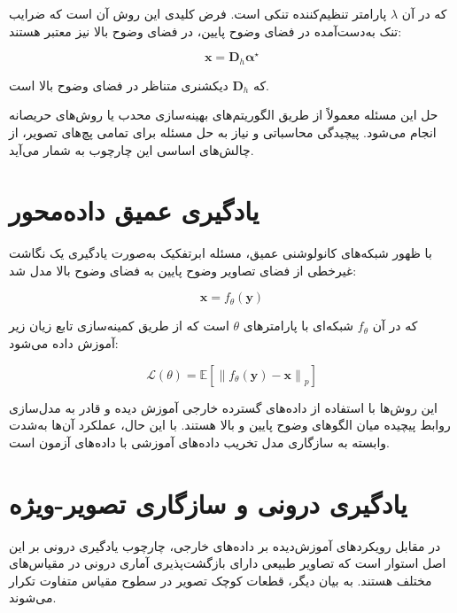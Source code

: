 که در آن $\lambda$ پارامتر تنظیم‌کننده تنکی است. فرض کلیدی این روش آن است که ضرایب تنک به‌دست‌آمده در فضای وضوح پایین، در فضای وضوح بالا نیز معتبر هستند:

\begin{equation}
	\mathbf{x} = \mathbf{D}_h \boldsymbol{\alpha}^\star
\end{equation}

که $\mathbf{D}_h$ دیکشنری متناظر در فضای وضوح بالا است.

حل این مسئله معمولاً از طریق الگوریتم‌های بهینه‌سازی محدب یا روش‌های حریصانه انجام می‌شود. پیچیدگی محاسباتی و نیاز به حل مسئله برای تمامی پچ‌های تصویر، از چالش‌های اساسی این چارچوب به شمار می‌آید.

\section{یادگیری عمیق داده‌محور}

با ظهور شبکه‌های کانولوشنی عمیق، مسئله ابرتفکیک به‌صورت یادگیری یک نگاشت غیرخطی از فضای تصاویر وضوح پایین به فضای وضوح بالا مدل شد:

\begin{equation}
	\mathbf{x} = f_\theta(\mathbf{y})
\end{equation}

که در آن $f_\theta$ شبکه‌ای با پارامترهای $\theta$ است که از طریق کمینه‌سازی تابع زیان زیر آموزش داده می‌شود:

\begin{equation}
	\mathcal{L}(\theta) =
	\mathbb{E}
	\left[
	\left\|
	f_\theta(\mathbf{y}) - \mathbf{x}
	\right\|_p
	\right]
\end{equation}

این روش‌ها با استفاده از داده‌های گسترده خارجی آموزش دیده و قادر به مدل‌سازی روابط پیچیده میان الگوهای وضوح پایین و بالا هستند. با این حال، عملکرد آن‌ها به‌شدت وابسته به سازگاری مدل تخریب داده‌های آموزشی با داده‌های آزمون است.

\section{یادگیری درونی و سازگاری تصویر-ویژه}

در مقابل رویکردهای آموزش‌دیده بر داده‌های خارجی، چارچوب یادگیری درونی بر این اصل استوار است که تصاویر طبیعی دارای بازگشت‌پذیری آماری درونی در مقیاس‌های مختلف هستند. به بیان دیگر، قطعات کوچک تصویر در سطوح مقیاس متفاوت تکرار می‌شوند.

